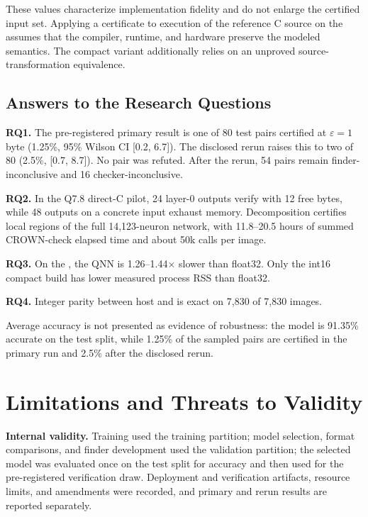 These values characterize implementation fidelity and do not enlarge the certified input set. Applying a certificate to execution of the reference C source on the \Aseven{} assumes that the compiler, runtime, and hardware preserve the modeled semantics. The compact variant additionally relies on an unproved source-transformation equivalence.

\subsection{Answers to the Research Questions}
\textbf{RQ1.} The pre-registered primary result is one of 80 test pairs certified at $\varepsilon = 1$ byte (1.25\%, 95\% Wilson CI [0.2, 6.7]). The disclosed rerun raises this to two of 80 (2.5\%, [0.7, 8.7]). No pair was refuted. After the rerun, 54 pairs remain finder-inconclusive and 16 checker-inconclusive.

\textbf{RQ2.} In the Q7.8 direct-C pilot, 24 layer-0 outputs verify with 12 free bytes, while 48 outputs on a concrete input exhaust memory. Decomposition certifies local regions of the full 14,123-neuron network, with 11.8--20.5 hours of summed CROWN-check elapsed time and about 50k calls per image.

\textbf{RQ3.} On the \Aseven{}, the QNN is 1.26--1.44$\times$ slower than float32. Only the int16 compact build has lower measured process RSS than float32.

\textbf{RQ4.} Integer parity between host and \Aseven{} is exact on 7,830 of 7,830 images.

Average accuracy is not presented as evidence of robustness: the model is 91.35\% accurate on the test split, while 1.25\% of the sampled pairs are certified in the primary run and 2.5\% after the disclosed rerun.

\section{Limitations and Threats to Validity}
\label{sec:limitations}

\textbf{Internal validity.} Training used the training partition; model selection, format comparisons, and finder development used the validation partition; the selected model was evaluated once on the test split for accuracy and then used for the pre-registered verification draw. Deployment and verification artifacts, resource limits, and amendments were recorded, and primary and rerun results are reported separately.

